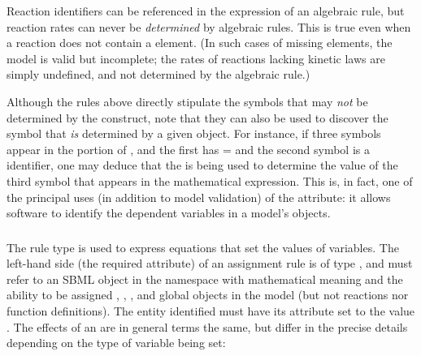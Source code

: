 Reaction identifiers can be referenced in the  
expression of an algebraic rule, but reaction rates can never be
\emph{determined} by algebraic rules.  This is true even when a
reaction does not contain a \KineticLaw element.  (In such cases
of missing \KineticLaw elements, the model is valid but 
incomplete; the rates of reactions lacking kinetic laws are
simply undefined, and not determined by the algebraic rule.)


Although the rules above directly stipulate the symbols that may \emph{not} be determined by the \AlgebraicRule construct, note that they can also be used to discover the symbol that \emph{is} determined by a given \AlgebraicRule object.  For instance, if three symbols appear in the  portion of \AlgebraicRule, and the first has = and the second symbol is a \Reaction identifier, one may deduce that the \AlgebraicRule is being used to determine the value of the third symbol that appears in the mathematical expression.  This is, in fact, one of the principal uses (in addition to model validation) of the  attribute: it allows software to identify the dependent variables in a model's \AlgebraicRule objects.


\subsubsection{}
\label{sec:assignmentrule}

The rule type \AssignmentRule is used to express equations that
set the values of variables.  The left-hand side (the required
 attribute) of an assignment rule is of type , and must refer to an SBML object in the  namespace with mathematical meaning and the ability to be assigned
\Species, \SpeciesReference, \Compartment, 
and global \Parameter objects in
the model (but not reactions nor function definitions).  The entity identified must
have its  attribute set to the value .  The effects of
an \AssignmentRule are in general terms the same, but differ in
the precise details depending on the type of variable being set:

